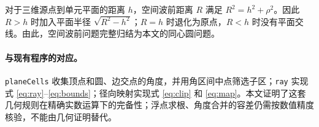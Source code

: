 \documentclass[UTF8,11pt,a4paper,fontset=fandol]{ctexart}
\numberwithin{equation}{section}
\begin{document}
对于三维源点到单元平面的距离 $h$，空间波前距离 $R$ 满足 $R^2=h^2+\rho^2$。因此 $R>h$ 时加入平面半径 $\sqrt{R^2-h^2}$；$R=h$ 时退化为原点，$R<h$ 时没有平面交线。由此，空间波前问题完整归结为本文的同心圆问题。

\paragraph{与现有程序的对应。}
\texttt{planeCells} 收集顶点和圆、边交点的角度，并用角区间中点筛选子区；\texttt{ray} 实现式 \eqref{eq:ray}--\eqref{eq:bounds}；径向映射实现式 \eqref{eq:clip} 和 \eqref{eq:map}。本文证明了这套几何规则在精确实数运算下的完备性；浮点求根、角度合并的容差仍需按数值精度核验，不能由几何证明替代。
\end{document}
